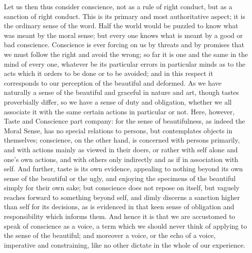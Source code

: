 Let us then thus consider conscience, not as a rule of right
conduct, but as a sanction of right conduct. This is its primary and
most authoritative aspect; it is the ordinary sense of the word. Half
the world would be puzzled to know what was meant by the moral sense;
but every one knows what is meant by a good or bad conscience.
Conscience is ever forcing on us by threats and by promises that we
must follow the right and avoid the wrong; so far it is one and the
same in the mind of every one, whatever be its particular errors
in particular minds as to the acts which it orders to be done or to be
avoided; and in this respect it corresponds to our perception of the
beautiful and deformed. As we have naturally a sense of the beautiful
and graceful in nature and art, though tastes proverbially differ, so
we have a sense of duty and obligation, whether we all associate it
with the same certain actions in particular or not. Here, however,
Taste and Conscience part company: for the sense of beautifulness, as
indeed the Moral Sense, has no special relations to persons, but
contemplates objects in themselves; conscience, on the other hand, is
concerned with persons primarily, and with actions mainly as viewed in
their doers, or rather with self alone and one's own actions, and with
others only indirectly and as if in association with self. And
further, taste is its own evidence, appealing to nothing beyond its
own sense of the beautiful or the ugly, and enjoying the specimens of
the beautiful simply for their own sake; but conscience does not
repose on itself, but vaguely reaches forward to something beyond
self, and dimly discerns a sanction higher than self for its
decisions, as is evidenced in that keen sense of obligation and
responsibility which informs them. And hence it is that we are
accustomed to speak of conscience as a voice, a term which we should
never think of applying to the sense of the beautiful; and moreover a
voice, or the echo of a voice, imperative and constraining, like no
other dictate in the whole of our experience.

